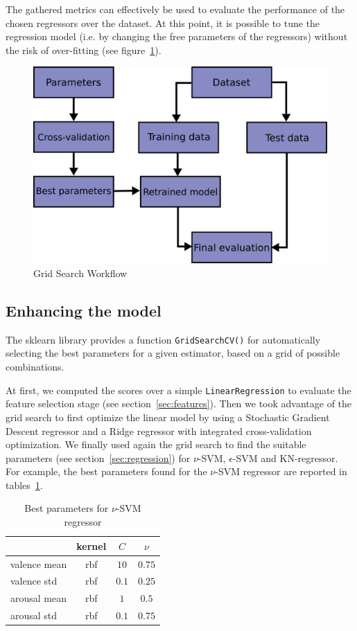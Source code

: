 The gathered metrics can effectively be used to evaluate the performance of the chosen regressors over the dataset.
At this point, it is possible to tune the regression model (i.e. by changing the free parameters of the regressors) without the risk of over-fitting (see figure~\ref{fig:grid-search-workflow}).

\begin{figure}
	\centering
	\includegraphics[width=0.5\linewidth]{assets/grid_search_workflow.png}
	\caption{Grid Search Workflow \cite{sklearn-crossval}}
	\label{fig:grid-search-workflow}
\end{figure}


\subsection{Enhancing the model}\label{sec:enhance-model}

The sklearn library provides a function \texttt{GridSearchCV()} for automatically selecting the best parameters for a given estimator, based on a grid of possible combinations.

At first, we computed the scores over a simple \texttt{LinearRegression} to evaluate the feature selection stage (see section~\ref{sec:features}).
Then we took advantage of the grid search to first optimize the linear model by using a Stochastic Gradient Descent regressor and a Ridge regressor with integrated cross-validation optimization.
We finally used again the grid search to find the suitable parameters (see section~\ref{sec:regression}) for $\nu$-SVM, $\epsilon$-SVM and KN-regressor.
For example, the best parameters found for the $\nu$-SVM regressor are reported in tables~\ref{table:cross-params-svr}.

\begin{table}
	\centering
	\begin{tabular}{lccc}
		\toprule
		& kernel & $C$ & $\nu$ \\
		\midrule
		valence mean & rbf & $10$ & $0.75$ \\
		valence std & rbf & $0.1$ & $0.25$ \\
		arousal mean & rbf & $1$ & $0.5$ \\
		arousal std & rbf & $0.1$ & $0.75$ \\
		\bottomrule
	\end{tabular}
	\caption{Best parameters for $\nu$-SVM regressor}
	\label{table:cross-params-svr}
\end{table}

